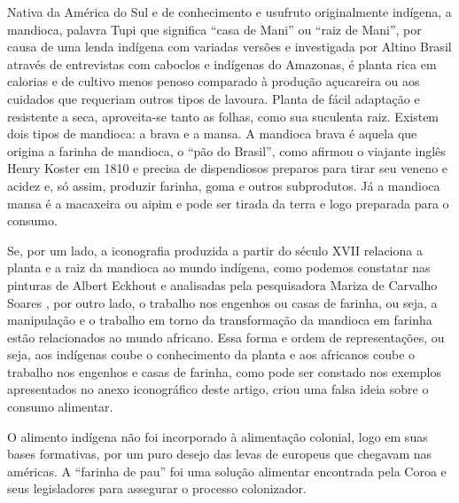 \begin{refsection}
Nativa da América do Sul e de conhecimento e usufruto originalmente indígena, a mandioca, palavra Tupi que significa ``casa de Mani'' ou ``raiz de Mani'', por causa de uma lenda indígena com variadas versões e investigada por Altino Brasil \citeyear{Brasil1987amazonia} através de entrevistas com caboclos e indígenas do Amazonas, é planta rica em calorias e de cultivo menos penoso comparado à produção açucareira ou aos cuidados que requeriam outros tipos de lavoura. Planta de fácil adaptação e resistente a seca, aproveita-se tanto as folhas, como sua suculenta raiz. Existem dois tipos de mandioca: a brava e a mansa. A mandioca brava é aquela que origina a farinha de mandioca, o ``pão do Brasil'', como afirmou o viajante inglês Henry Koster em 1810 \citeyear[p.~113]{Koster1942viagens} e precisa de dispendiosos preparos para tirar seu veneno e acidez e, só assim, produzir farinha, goma e outros subprodutos. Já a mandioca mansa é a macaxeira ou aipim e pode ser tirada da terra e logo preparada para o consumo. 

Se, por um lado, a iconografia produzida a partir do século XVII relaciona a planta e a raiz da mandioca ao mundo indígena, como podemos constatar nas pinturas de Albert Eckhout e analisadas pela pesquisadora Mariza de Carvalho Soares \citeyear{Soares2009engenho}, por outro lado, o trabalho nos engenhos ou casas de farinha, ou seja, a manipulação e o trabalho em torno da transformação da mandioca em farinha estão relacionados ao mundo africano. Essa forma e ordem de representações, ou seja, aos indígenas coube o conhecimento da planta e aos africanos coube o trabalho nos engenhos e casas de farinha, como pode ser constado nos exemplos apresentados no anexo iconográfico deste artigo, criou uma falsa ideia sobre o consumo alimentar.  

O alimento indígena não foi incorporado à alimentação colonial, logo em suas bases formativas, por um puro desejo das levas de europeus que chegavam nas américas. A ``farinha de pau'' foi uma solução alimentar encontrada pela Coroa e seus legisladores para assegurar o processo colonizador.  


\end{refsection}
